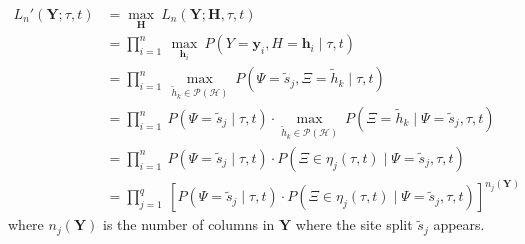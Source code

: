 \documentclass[a4paper]{article}
\newcommand{\fullAlignment}{\mathbf{Y}}
\newcommand{\alignmentColumn}{\mathbf{y}}
\newcommand{\alignmentColumnRV}{Y}
\newcommand{\siteSplit}{\tilde{s}}
\newcommand{\fullAncestralStates}{\mathbf{H}}
\newcommand{\ancestralStateColumn}{\mathbf{h}}
\newcommand{\ancestralStateColumnRV}{H}
\newcommand{\ancestralSplit}{\tilde{h}}
\newcommand{\ancestralSplitSet}{\mathcal{H}}
\newcommand{\ancestralSplitPartition}{\eta}
\newcommand{\siteSplitRV}{\Psi}
\newcommand{\ancestralSplitRV}{\Xi}
\newcommand{\nCols}{n}
\newcommand{\nSiteSplits}{q}
\begin{document}
\begin{align}
L_\nCols'(\fullAlignment;\tau, t) &= \max_{\fullAncestralStates} \ L_\nCols(\fullAlignment;\fullAncestralStates, \tau, t) \\
                             &= \prod_{i=1}^{\nCols} \ \max_{\ancestralStateColumn_i} \ P(\alignmentColumnRV=\alignmentColumn_i, \ancestralStateColumnRV=\ancestralStateColumn_i \mid \tau, t) \\
                             &= \prod_{i=1}^{\nCols} \ \max_{\ancestralSplit_k\in\mathcal{P}(\ancestralSplitSet)} \ P(\siteSplitRV=\siteSplit_j, \ancestralSplitRV=\ancestralSplit_k \mid \tau, t) \\
                             &= \prod_{i=1}^{\nCols} \ P(\siteSplitRV=\siteSplit_j \mid  \tau, t)\cdot\max_{\ancestralSplit_k\in\mathcal{P}(\ancestralSplitSet)} \ P(\ancestralSplitRV=\ancestralSplit_k  \mid \siteSplitRV=\siteSplit_j, \tau, t) \\
                             &= \prod_{i=1}^{\nCols} \ P(\siteSplitRV=\siteSplit_j \mid \tau, t)\cdot P(\ancestralSplitRV\in\ancestralSplitPartition_j(\tau, t) \mid \siteSplitRV=\siteSplit_j, \tau, t) \\
                             &= \prod_{j=1}^{\nSiteSplits} \ \left[P(\siteSplitRV=\siteSplit_j \mid \tau, t)\cdot P(\ancestralSplitRV\in\ancestralSplitPartition_j(\tau, t) \mid \siteSplitRV=\siteSplit_j, \tau, t)\right] ^{\nCols_j(\fullAlignment)} \label{eq:site_pattern_likelihood}
\end{align}
where $\nCols_j(\fullAlignment)$ is the number of columns in $\fullAlignment$ where the site split $\siteSplit_j$ appears.
\end{document}
